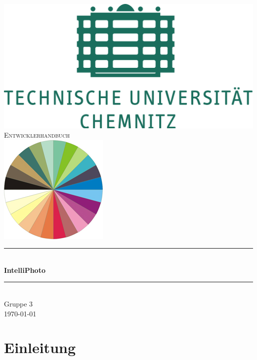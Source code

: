 \documentclass[11pt,a4paper]{article}
\begin{document}
\begin{titlepage}
\newcommand{\HRule}{\rule{\linewidth}{0.5mm}}
\center
\includegraphics[scale=0.075]{tuchem.png} \\[1cm]
\textsc{\LARGE
Entwicklerhandbuch
} \\[1cm]
\includegraphics[scale=0.9]{logo.jpg} \\[1cm]
\HRule \\[0.4cm]
{ \huge \bfseries IntelliPhoto \\[0.15cm] }
\HRule \\[1.5cm]
Gruppe 3
\\[1cm]
\today \\ [1cm]
\end{titlepage}


\tableofcontents
\newpage


\section{Einleitung}
\end{document}
